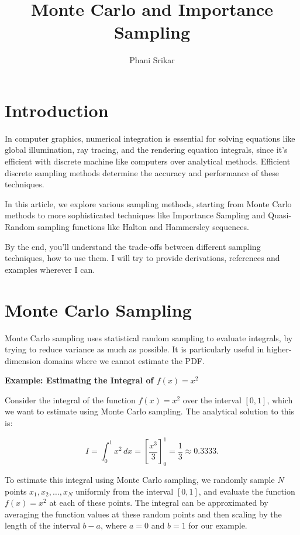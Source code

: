 \documentclass{article}
\title{Monte Carlo and Importance Sampling}
\author{Phani Srikar}
\begin{document}
\maketitle
\section{Introduction}
	In computer graphics, numerical integration is essential for solving equations like global illumination, ray tracing, and the rendering  equation integrals, since it's efficient with discrete machine like computers over analytical methods. Efficient discrete sampling methods determine the accuracy and performance of these techniques. 
	
	In this article, we explore various sampling methods, starting from Monte Carlo methods to more sophisticated techniques like Importance Sampling and Quasi-Random sampling functions like Halton and Hammersley sequences. 
	
	By the end, you'll understand the trade-offs between different sampling techniques, how to use them. I will try to provide derivations, references and examples wherever I can.
\section {Monte Carlo Sampling}

Monte Carlo sampling uses statistical random sampling to evaluate integrals, by trying to reduce variance as much as possible. It is particularly useful in higher-dimension domains where we cannot estimate the PDF.

\textbf{Example: Estimating the Integral of \( f(x) = x^2 \)}

Consider the integral of the function \( f(x) = x^2 \) over the interval \( [0, 1] \), which we want to estimate using Monte Carlo sampling. The analytical solution to this is:

\[
I = \int_0^1 x^2 \, dx = \left[ \frac{x^3}{3} \right]_0^1 = \frac{1}{3} \approx 0.3333.
\]

To estimate this integral using Monte Carlo sampling, we randomly sample \( N \) points \( x_1, x_2, \dots, x_N \) uniformly from the interval \( [0, 1] \), and evaluate the function \( f(x) = x^2 \) at each of these points. The integral can be approximated by averaging the function values at these random points and then scaling by the length of the interval \( b - a \), where \( a = 0 \) and \( b = 1 \) for our example.
\end{document}
